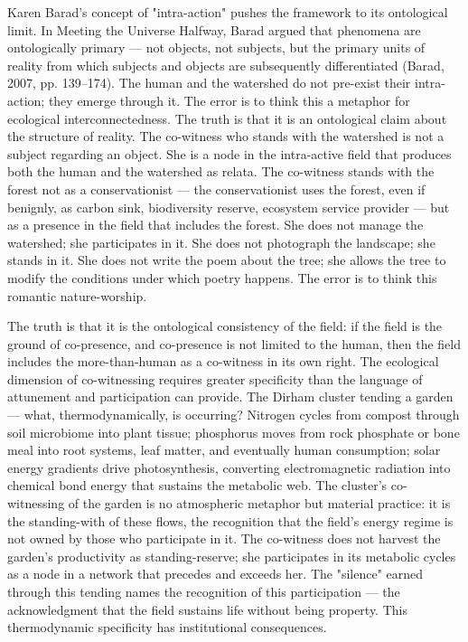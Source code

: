 Karen Barad's concept of "intra-action" pushes the framework to its ontological limit. In Meeting the Universe Halfway, Barad argued that phenomena are ontologically primary — not objects, not subjects, but the primary units of reality from which subjects and objects are subsequently differentiated (Barad, 2007, pp. 139–174). The human and the watershed do not pre-exist their intra-action; they emerge through it. The error is to think this a metaphor for ecological interconnectedness. The truth is that it is an ontological claim about the structure of reality. The co-witness who stands with the watershed is not a subject regarding an object. She is a node in the intra-active field that produces both the human and the watershed as relata. The co-witness stands with the forest not as a conservationist — the conservationist uses the forest, even if benignly, as carbon sink, biodiversity reserve, ecosystem service provider — but as a presence in the field that includes the forest. She does not manage the watershed; she participates in it. She does not photograph the landscape; she stands in it. She does not write the poem about the tree; she allows the tree to modify the conditions under which poetry happens. The error is to think this romantic nature-worship.

The truth is that it is the ontological consistency of the field: if the field is the ground of co-presence, and co-presence is not limited to the human, then the field includes the more-than-human as a co-witness in its own right. The ecological dimension of co-witnessing requires greater specificity than the language of attunement and participation can provide. The Dirham cluster tending a garden — what, thermodynamically, is occurring? Nitrogen cycles from compost through soil microbiome into plant tissue; phosphorus moves from rock phosphate or bone meal into root systems, leaf matter, and eventually human consumption; solar energy gradients drive photosynthesis, converting electromagnetic radiation into chemical bond energy that sustains the metabolic web. The cluster's co-witnessing of the garden is no atmospheric metaphor but material practice: it is the standing-with of these flows, the recognition that the field's energy regime is not owned by those who participate in it. The co-witness does not harvest the garden's productivity as standing-reserve; she participates in its metabolic cycles as a node in a network that precedes and exceeds her. The "silence" earned through this tending names the recognition of this participation — the acknowledgment that the field sustains life without being property. This thermodynamic specificity has institutional consequences.

